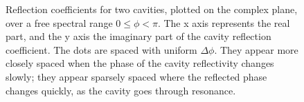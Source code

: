 
\begin{figure}
\hfill {}\caption[Cavity amplitude reflectivity plotted in the complex plane]{Reflection coefficients for two cavities, plotted on the complex plane,
over a free spectral range $0\leq\phi<\pi$. The x axis represents
the real part, and the y axis the imaginary part of the cavity reflection
coefficient. The dots are spaced with uniform $\Delta\phi$. They
appear more closely spaced when the phase of the cavity reflectivity
changes slowly; they appear sparsely spaced where the reflected phase
changes quickly, as the cavity goes through resonance.}
\end{figure}

